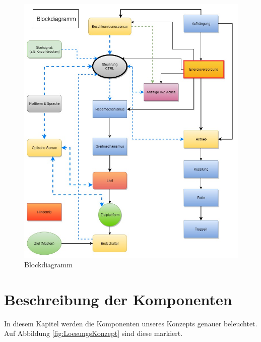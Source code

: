\documentclass[a4paper]{report}
\begin{document}
\begin{figure}[h!]
	\centering
	\includegraphics[keepaspectratio,width=\textwidth]{Blockdiagramm}
	\caption{Blockdiagramm}
	\label{fig:Blockdiagramm}
\end{figure}

\section{Beschreibung der Komponenten}
\label{sec:KompBeschrieb}
In diesem Kapitel werden die Komponenten unseres Konzepts genauer beleuchtet. Auf Abbildung \ref{fig:LoesungsKonzept} sind diese markiert.
\end{document}
